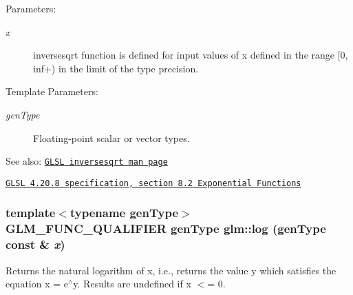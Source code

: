 \begin{Desc}
\item[Parameters:]
\begin{description}
\item[{\em x}]inversesqrt function is defined for input values of x defined in the range \mbox{[}0, inf+) in the limit of the type precision. \end{description}
\end{Desc}
\begin{Desc}
\item[Template Parameters:]
\begin{description}
\item[{\em genType}]Floating-point scalar or vector types.\end{description}
\end{Desc}
\begin{Desc}
\item[See also:]\href{http://www.opengl.org/sdk/docs/manglsl/xhtml/inversesqrt.xml}{\tt GLSL inversesqrt man page} 

\href{http://www.opengl.org/registry/doc/GLSLangSpec.4.20.8.pdf}{\tt GLSL 4.20.8 specification, section 8.2 Exponential Functions} \end{Desc}
\hypertarget{group__core__func__exponential_gce8148db3949f9260f6f883f8dbae808}{
\subsubsection[log]{\setlength{\rightskip}{0pt plus 5cm}template$<$typename genType$>$ GLM\_\-FUNC\_\-QUALIFIER genType glm::log (genType const \& {\em x})}}
\label{group__core__func__exponential_gce8148db3949f9260f6f883f8dbae808}


Returns the natural logarithm of x, i.e., returns the value y which satisfies the equation x = e$^\wedge$y. Results are undefined if x $<$= 0.

